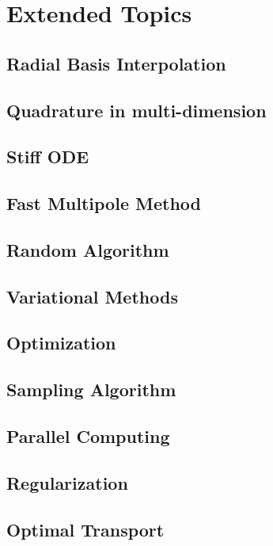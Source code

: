 \chapter{Extended Topics}

\section{Radial Basis Interpolation}

\section{Quadrature in multi-dimension}

\section{Stiff ODE}

\section{Fast Multipole Method}

\section{Random Algorithm}

\section{Variational Methods}
\section{Optimization}

\section{Sampling Algorithm}

\section{Parallel Computing}

\section{Regularization}

\section{Optimal Transport}

